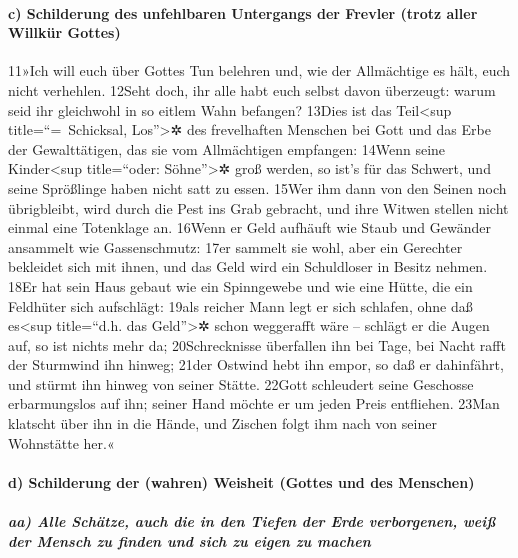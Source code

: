 \hypertarget{c-schilderung-des-unfehlbaren-untergangs-der-frevler-trotz-aller-willkuxfcr-gottes}{%
\paragraph{c) Schilderung des unfehlbaren Untergangs der Frevler (trotz
aller Willkür
Gottes)}\label{c-schilderung-des-unfehlbaren-untergangs-der-frevler-trotz-aller-willkuxfcr-gottes}}

11»Ich will euch über Gottes Tun belehren und, wie der Allmächtige es
hält, euch nicht verhehlen. 12Seht doch, ihr alle habt euch selbst davon
überzeugt: warum seid ihr gleichwohl in so eitlem Wahn befangen? 13Dies
ist das Teil\textless sup title=``=~Schicksal, Los''\textgreater✲ des
frevelhaften Menschen bei Gott und das Erbe der Gewalttätigen, das sie
vom Allmächtigen empfangen: 14Wenn seine Kinder\textless sup
title=``oder: Söhne''\textgreater✲ groß werden, so ist's für das
Schwert, und seine Sprößlinge haben nicht satt zu essen. 15Wer ihm dann
von den Seinen noch übrigbleibt, wird durch die Pest ins Grab gebracht,
und ihre Witwen stellen nicht einmal eine Totenklage an. 16Wenn er Geld
aufhäuft wie Staub und Gewänder ansammelt wie Gassenschmutz: 17er
sammelt sie wohl, aber ein Gerechter bekleidet sich mit ihnen, und das
Geld wird ein Schuldloser in Besitz nehmen. 18Er hat sein Haus gebaut
wie ein Spinngewebe und wie eine Hütte, die ein Feldhüter sich
aufschlägt: 19als reicher Mann legt er sich schlafen, ohne daß
es\textless sup title=``d.h. das Geld''\textgreater✲ schon weggerafft
wäre -- schlägt er die Augen auf, so ist nichts mehr da; 20Schrecknisse
überfallen ihn bei Tage, bei Nacht rafft der Sturmwind ihn hinweg; 21der
Ostwind hebt ihn empor, so daß er dahinfährt, und stürmt ihn hinweg von
seiner Stätte. 22Gott schleudert seine Geschosse erbarmungslos auf ihn;
seiner Hand möchte er um jeden Preis entfliehen. 23Man klatscht über ihn
in die Hände, und Zischen folgt ihm nach von seiner Wohnstätte her.«

\hypertarget{d-schilderung-der-wahren-weisheit-gottes-und-des-menschen}{%
\paragraph{d) Schilderung der (wahren) Weisheit (Gottes und des
Menschen)}\label{d-schilderung-der-wahren-weisheit-gottes-und-des-menschen}}

\hypertarget{aa-alle-schuxe4tze-auch-die-in-den-tiefen-der-erde-verborgenen-weiuxdf-der-mensch-zu-finden-und-sich-zu-eigen-zu-machen}{%
\subparagraph{aa) Alle Schätze, auch die in den Tiefen der Erde
verborgenen, weiß der Mensch zu finden und sich zu eigen zu
machen}\label{aa-alle-schuxe4tze-auch-die-in-den-tiefen-der-erde-verborgenen-weiuxdf-der-mensch-zu-finden-und-sich-zu-eigen-zu-machen}}

